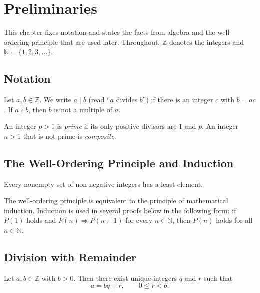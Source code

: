 \chapter{Preliminaries}\label{ch:prelim}

This chapter fixes notation and states the facts from algebra and the well-ordering principle that are used later. Throughout, $\mathbb{Z}$ denotes the integers and $\mathbb{N}=\{1,2,3,\dots\}$.

\section{Notation}

\begin{definition}
Let $a,b\in\mathbb{Z}$. We write $a\mid b$ (read ``$a$ divides $b$'') if there is an integer $c$ with $b=ac$. If $a\nmid b$, then $b$ is not a multiple of $a$.
\end{definition}

\begin{definition}
An integer $p>1$ is \emph{prime} if its only positive divisors are $1$ and $p$. An integer $n>1$ that is not prime is \emph{composite}.
\end{definition}

\section{The Well-Ordering Principle and Induction}

\begin{definition}
Every nonempty set of non-negative integers has a least element.
\end{definition}

The well-ordering principle is equivalent to the principle of mathematical induction. Induction is used in several proofs below in the following form: if $P(1)$ holds and $P(n)\Rightarrow P(n+1)$ for every $n\in\mathbb{N}$, then $P(n)$ holds for all $n\in\mathbb{N}$.

\section{Division with Remainder}

\begin{theorem}\label{thm:division}
Let $a,b\in\mathbb{Z}$ with $b>0$. Then there exist unique integers $q$ and $r$ such that
\[
  a = bq + r, \qquad 0 \le r < b.
\]
\end{theorem}

